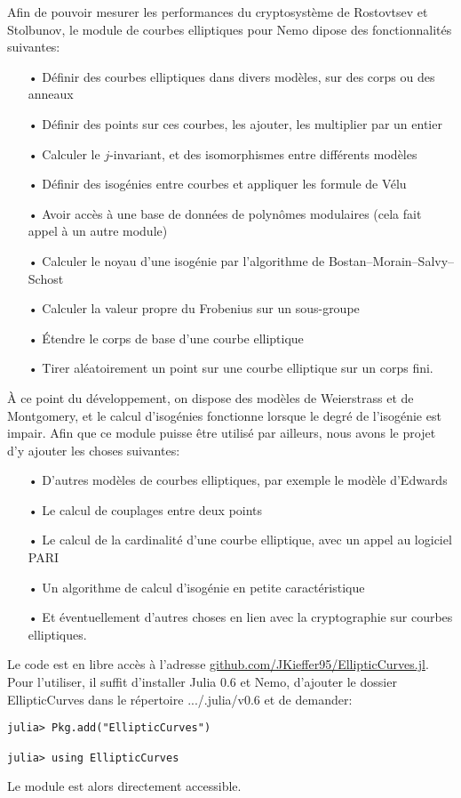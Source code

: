 \documentclass[11pt,a4paper]{article}
\renewcommand{\v}{\vspace{5mm}}
\theoremstyle{definition}
\begin{document}
Afin de pouvoir mesurer les performances du cryptosystème de Rostovtsev et Stolbunov, le module de courbes elliptiques pour Nemo dipose des fonctionnalités suivantes:
\begin{itemize}
\item[•] Définir des courbes elliptiques dans divers modèles, sur des corps ou des anneaux
\item[•] Définir des points sur ces courbes, les ajouter, les multiplier par un entier
\item[•] Calculer le $j$-invariant, et des isomorphismes entre différents modèles
\item[•] Définir des isogénies entre courbes et appliquer les formule de Vélu
\item[•] Avoir accès à une base de données de polynômes modulaires (cela fait appel à un autre module)
\item[•] Calculer le noyau d'une isogénie par l'algorithme de Bostan--Morain--Salvy--Schost
\item[•] Calculer la valeur propre du Frobenius sur un sous-groupe
\item[•] Étendre le corps de base d'une courbe elliptique
\item[•] Tirer aléatoirement un point sur une courbe elliptique sur un corps fini.
\end{itemize}

\v
À ce point du développement, on dispose des modèles de Weierstrass et de Montgomery, et le calcul d'isogénies fonctionne lorsque le degré de l'isogénie est impair. Afin que ce module puisse être utilisé par ailleurs, nous avons le projet d'y ajouter les choses suivantes:

\begin{itemize}
\item[•] D'autres modèles de courbes elliptiques, par exemple le modèle d'Edwards
\item[•] Le calcul de couplages entre deux points
\item[•] Le calcul de la cardinalité d'une courbe elliptique, avec un appel au logiciel PARI
\item[•] Un algorithme de calcul d'isogénie en petite caractéristique
\item[•] Et éventuellement d'autres choses en lien avec la cryptographie sur courbes elliptiques.
\end{itemize}

\v
Le code est en libre accès à l'adresse \url{github.com/JKieffer95/EllipticCurves.jl}. Pour l'utiliser, il suffit d'installer Julia 0.6 et Nemo, d'ajouter le dossier EllipticCurves dans le répertoire .../.julia/v0.6 et de demander: 
\begin{verbatim}
julia> Pkg.add("EllipticCurves")

julia> using EllipticCurves
\end{verbatim}
Le module est alors directement accessible.
\end{document}
